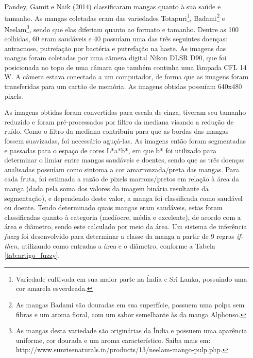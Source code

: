 Pandey, Gamit e Naik (2014) classificaram mangas quanto à sua saúde e tamanho. As mangas coletadas eram das variedades Totapuri\footnote{\label{ftnote:totapuri}Variedade cultivada em sua maior parte na Índia e Sri Lanka, possuindo uma cor amarela esverdeada.}, Badami\footnote{\label{ftnote:badami}As mangas Badami são douradas em sua superfície, possuem uma polpa sem fibras e um aroma floral, com um sabor semelhante às da manga Alphonso.} e Neelam\footnote{\label{ftnote:neelam}As mangas desta variedade são originárias da Índia e possuem uma aparência uniforme, cor dourada e um aroma característico. Saiba mais em: http://www.sunrisenaturals.in/products/13/neelam-mango-pulp.php.}, sendo que elas diferiam quanto ao formato e tamanho. Dentre as 100 colhidas, 60 eram saudáveis e 40 possuíam uma das três seguintes doenças: antracnose, putrefação por bactéria e putrefação na haste. As imagens das mangas foram coletadas por uma câmera digital Nikon DLSR D90, que foi posicionada no topo de uma câmara que também continha uma lâmpada CFL 14 W. A câmera estava conectada a um computador, de forma que as imagens foram transferidas para um cartão de memória. As imagens obtidas possuíam 640x480 pixels. 


As imagens obtidas foram convertidas para escala de cinza, tiveram seu tamanho reduzido e foram pré-processados por filtro da mediana visando a redução de ruído. Como o filtro da mediana contribuiu para que as bordas das mangas fossem suavizadas, foi necessário aguçá-las. As imagens então foram segmentadas e passadas para o espaço de cores L*a*b*, em que b* foi utilizado para determinar o limiar entre mangas saudáveis e doentes, sendo que as três doenças analisadas possuíam como sintoma a cor amarronzada/preta das mangas. Para cada fruta, foi estimada a razão de pixels marrons/pretos em relação à área da manga (dada pela soma dos valores da imagem binária resultante da segmentação), e dependendo deste valor, a manga foi classificada como saudável ou doente. Tendo determinado quais mangas eram saudáveis, estas foram classificadas quanto à categoria (medíocre, média e excelente), de acordo com a área e diâmetro, sendo este calculado por meio da área. Um sistema de inferência \textit{fuzzy} foi desenvolvido para determinar a classe da manga a partir de 9 regras \textit{if-then}, utilizando como entradas a área e o diâmetro, conforme a Tabela \ref{tab:artigo_fuzzy}.

